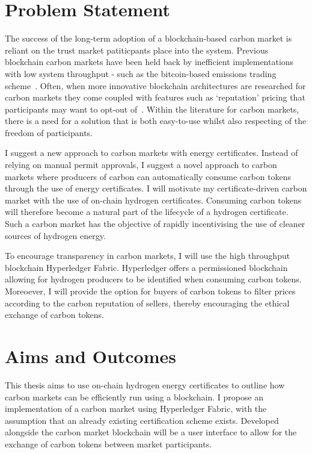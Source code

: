 \section{Problem Statement}

The success of the long-term adoption of a blockchain-based carbon
market is reliant on the trust market patiticpants place into the
system. Previous blockchain carbon markets have been held back by
inefficient implementations with low system throughput - such as
the bitcoin-based emissions trading scheme~\cite{vic15}. Often, when
more innovative blockchain architectures are researched for carbon markets
they come coupled with features such as `reputation' pricing that
participants may want to opt-out of~\cite{KHAQQI20188}. Within the
literature for carbon markets, there is a need for a solution that is
both easy-to-use whilst also respecting of the freedom of participants.

I suggest a new approach to carbon markets with energy certificates.
Instead of relying on manual permit approvals, I suggest a novel approach
to carbon markets where producers of carbon can automatically consume
carbon tokens through the use of energy certificates. I will motivate
my certificate-driven carbon market with the use of on-chain
hydrogen certificates. Consuming carbon tokens will therefore become
a natural part of the lifecycle of a hydrogen certificate. Such a
carbon market has the objective of rapidly incentivising the use of
cleaner sources of hydrogen energy.

To encourage transparency in carbon markets, I will use the high throughput
blockchain Hyperledger Fabric. Hyperledger offers a permissioned
blockchain allowing for hydrogen producers to be identified when consuming
carbon tokens. Moreoever, I will provide the option for buyers of
carbon tokens to filter prices according to the carbon reputation of
sellers, thereby encouraging the ethical exchange of carbon tokens.

\section{Aims and Outcomes}

This thesis aims to use on-chain hydrogen energy certificates to
outline how carbon markets can be efficiently run using a blockchain.
I propose an implementation of a carbon market using Hyperledger
Fabric, with the assumption that an already existing
certification scheme exists. Developed alongside the carbon
market blockchain will be a user interface to allow for the
exchange of carbon tokens between market participants.

